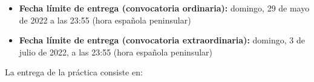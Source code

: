 \begin{itemize}
  \item \textbf{Fecha límite de entrega (convocatoria ordinaria):} domingo, 29 de mayo de 2022 a las 23:55 (hora española peninsular)
\item \textbf{Fecha límite de entrega (convocatoria extraordinaria):} domingo, 3 de julio de 2022, a las 23:55 (hora española peninsular)

    

\end{itemize}

La entrega de la práctica consiste en:

